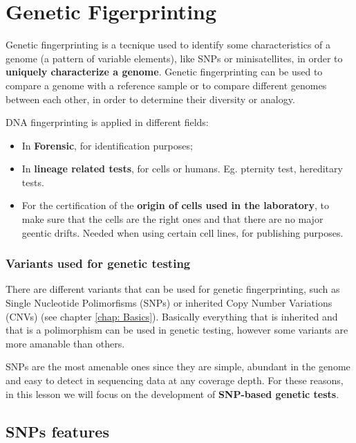 \graphicspath{{chapters/GeneticFingImages/}}
\chapter{Genetic Figerprinting}

Genetic fingerprinting is a tecnique used to identify some characteristics of a
genome (a pattern of variable elements), like SNPs or minisatellites, in order
to \textbf{uniquely characterize a genome}. Genetic fingerprinting can be used
to compare a genome with a reference sample or to compare different genomes
between each other, in order to determine their diversity or analogy. 

DNA fingerprinting is applied in different fields:

\begin{itemize}
	\item In \textbf{Forensic}, for identification purposes;
	\item In \textbf{lineage related tests}, for cells or humans. Eg. pternity
	test, hereditary tests.
	\item For the certification of the \textbf{origin of cells used in the
	laboratory}, to make sure that the cells are the right ones and that there
	are no major geentic drifts. Needed when using certain cell lines, for
	publishing purposes.
\end{itemize}


\subsection{Variants used for genetic testing}

There are different variants that can be used for genetic fingerprinting, such
as Single Nucleotide Polimorfisms (SNPs) or inherited Copy Number Variations
(CNVs) (see chapter \ref{chap: Basics}). Basically everything that is inherited
and that is a polimorphism can be used in genetic testing, however some variants
are more amanable than others. 

SNPs are the most amenable ones since they are simple, abundant in the genome
and easy to detect in sequencing data at any coverage depth. For these reasons,
in this lesson we will focus on the development of \textbf{SNP-based genetic
tests}.

\section{SNPs features}

